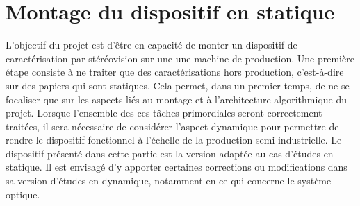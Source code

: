 \documentclass[a4paper, 11pt]{article}
\begin{document}
\section{Montage du dispositif en statique}
	L'objectif du projet est d'être en capacité de monter un dispositif de caractérisation par stéréovision sur une une machine de production. Une première étape consiste à ne traiter que des caractérisations hors production, c'est-à-dire sur des papiers qui sont statiques. Cela permet, dans un premier temps, de ne se focaliser que sur les aspects liés au montage et à l'architecture algorithmique du projet. Lorsque l'ensemble des ces tâches primordiales seront correctement traitées, il sera nécessaire de considérer l'aspect dynamique pour permettre de rendre le dispositif fonctionnel à l'échelle de la production semi-industrielle. Le dispositif présenté dans cette partie est la version adaptée au cas d'études en statique. Il est envisagé d'y apporter certaines corrections ou modifications dans sa version d'études en dynamique, notamment en ce qui concerne le système optique.
\end{document}
